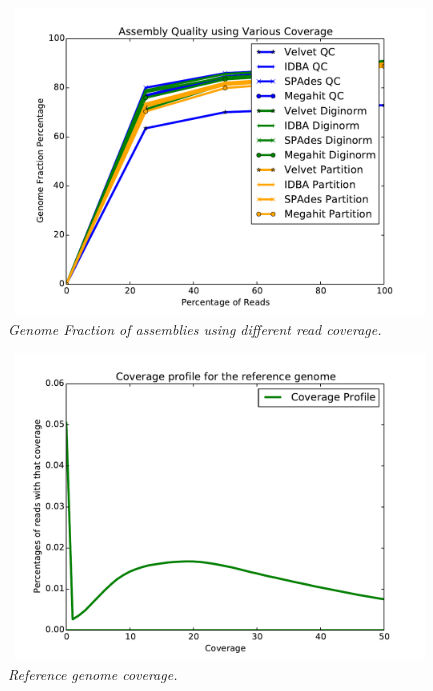 \begin{figure} [h] 
\begin{center}  
 
\includegraphics[height=3.2in,width=4.5in]{sampling.pdf}  
\caption{\small \sl Genome Fraction of assemblies using different read coverage.\label{fig:sampling}}  
\end{center}  
\end{figure}  
 

\begin{figure} [h] 
\begin{center}  
 
\includegraphics[height=3.2in,width=4.5in]{profilecoveragereads.pdf}  
\caption{\small \sl Reference genome coverage.\label{fig:coverage-profile}}  
\end{center}  
\end{figure} 


